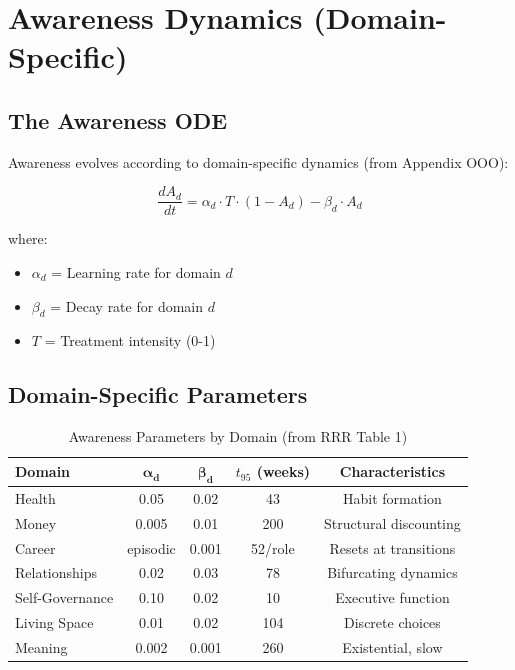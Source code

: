 \section{Awareness Dynamics (Domain-Specific)}
\label{sec:calc-awareness}

\subsection{The Awareness ODE}

Awareness evolves according to domain-specific dynamics (from Appendix OOO):

\begin{equation}
\boxed{
\frac{dA_d}{dt} = \alpha_d \cdot T \cdot (1 - A_d) - \beta_d \cdot A_d
}
\label{eq:awareness-ode}
\end{equation}

where:
\begin{itemize}
\item $\alpha_d$ = Learning rate for domain $d$
\item $\beta_d$ = Decay rate for domain $d$
\item $T$ = Treatment intensity (0-1)
\end{itemize}

\subsection{Domain-Specific Parameters}

\begin{table}[htbp]
\centering
\caption{Awareness Parameters by Domain (from RRR Table 1)}
\label{tab:awareness-params}
\renewcommand{\arraystretch}{1.3}
\begin{tabular}{@{}lcccc@{}}
\toprule
\textbf{Domain} & $\boldsymbol{\alpha_d}$ & $\boldsymbol{\beta_d}$ & \textbf{$t_{95}$ (weeks)} & \textbf{Characteristics} \\
\midrule
Health & 0.05 & 0.02 & 43 & Habit formation \\
Money & 0.005 & 0.01 & 200 & Structural discounting \\
Career & episodic & 0.001 & 52/role & Resets at transitions \\
Relationships & 0.02 & 0.03 & 78 & Bifurcating dynamics \\
Self-Governance & 0.10 & 0.02 & 10 & Executive function \\
Living Space & 0.01 & 0.02 & 104 & Discrete choices \\
Meaning & 0.002 & 0.001 & 260 & Existential, slow \\
\bottomrule
\end{tabular}
\end{table}

